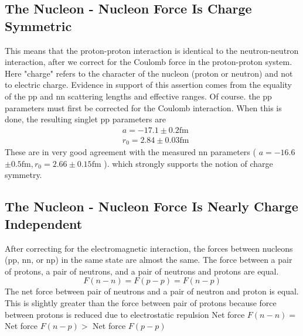 \subsection{ The Nucleon - Nucleon Force Is Charge Symmetric}
This means that the proton-proton interaction is identical to the neutron-neutron interaction, after we correct for the Coulomb force in the proton-proton system. Here "charge" refers to the character of the nucleon (proton or neutron) and not to electric charge. Evidence in support of this assertion comes from the equality of the pp and nn scattering lengths and effective ranges. Of course. the pp parameters must first be corrected for the Coulomb interaction. When this is done, the resulting singlet pp parameters are
 \begin{align*}
	&a=-17.1 \pm 0.2 \mathrm{fm} \\
	&r_{0}=2.84 \pm 0.03 \mathrm{fm}
\end{align*}
These are in very good agreement with the measured nn parameters ( $a=-16.6$ $\pm 0.5 \mathrm{fm}, r_{0}=2.66 \pm 0.15 \mathrm{fm}$ ). which strongly supports the notion of charge symmetry.
\subsection{The Nucleon - Nucleon Force Is Nearly Charge Independent}
After correcting for the electromagnetic interaction, the forces between nucleons (pp, nn, or np) in the same state are almost the same.
The force between a pair of protons, a pair of neutrons, and a pair of neutrons and protons are equal.
$$
F(n-n)=F(p-p)=F(n-p)
$$
The net force between pair of neutrons and a pair of neutron and proton is equal. This is slightly greater than the force between pair of protons because force between protons is reduced due to electrostatic repulsion
Net force $F(n-n)=$ Net force $F(n-p)>$ Net force $F(p-p)$